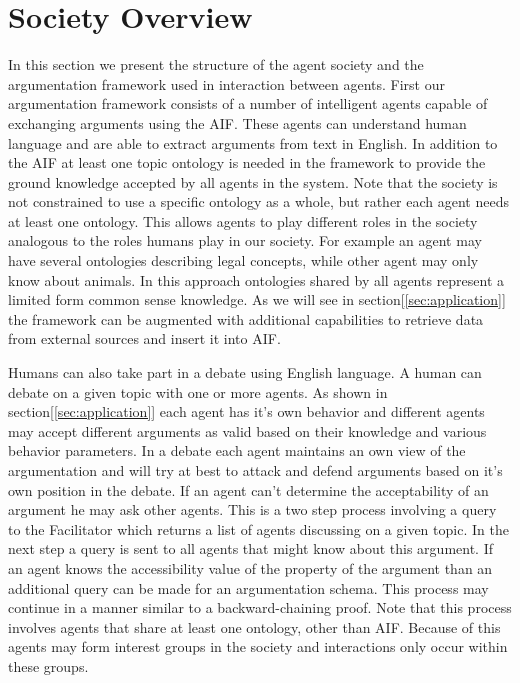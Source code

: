 
\section{Society Overview}
\label{sec:society}

In this section we present the structure of the agent society and the argumentation framework used in interaction between agents. First our argumentation framework consists of a number of intelligent agents capable of exchanging arguments using the AIF\cite{AIF}. These agents can understand human language and are able to extract arguments from text in English. In addition to the AIF at least one topic ontology is needed in the framework to provide the ground knowledge accepted by all agents in the system. Note that the society is not constrained to use a specific ontology as a whole, but rather each agent needs at least one ontology. This allows agents to play different roles in the society analogous to the roles humans play in our society. For example an agent may have several ontologies describing legal concepts, while other agent may only know about animals. In this approach ontologies shared by all agents represent a limited form common sense knowledge. As we will see in section[\ref{sec:application}] the framework can be augmented with additional capabilities to retrieve data from external sources and insert it into AIF. 

Humans can also take part in a debate using English language. A human can debate on a given topic with one or more agents. As shown in section[\ref{sec:application}] each agent has it's own behavior and different agents may accept different arguments as valid based on their knowledge and various behavior parameters. In a debate each agent maintains an own view of the argumentation and will try at best to attack and defend arguments based on it's own position in the debate. If an agent can't determine the acceptability of an argument he may ask other agents. This is a two step process involving a query to the Facilitator  which returns a list of agents discussing on a given topic. In the next step a query is sent to all agents that might know about this argument. If an agent knows the accessibility value of the property of the argument than an additional query can be made for an argumentation schema. This process may continue in a manner similar to a backward-chaining proof. Note that this process involves agents that share at least one ontology, other than AIF. Because of this agents may form interest groups in the society and interactions only occur within these groups.

